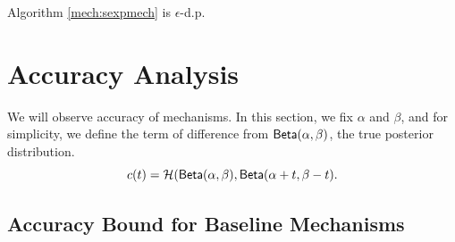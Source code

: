 \documentclass{article}
\begin{document}
\begin{thm}
  Algorithm \ref{mech:sexpmech} is $\epsilon$-d.p.
\end{thm}
\section{Accuracy Analysis}
We will observe accuracy of mechanisms.
In this section, we fix $\alpha$ and $\beta$, and for simplicity, we define the term of difference from $\mathsf{Beta}(\alpha, \beta)$, the true posterior distribution.
\[
c(t) = \mathcal{H}(\mathsf{Beta}(\alpha, \beta), \mathsf{Beta}(\alpha + t, \beta - t).
\]
\subsection{Accuracy Bound for Baseline Mechanisms}

\end{document}
